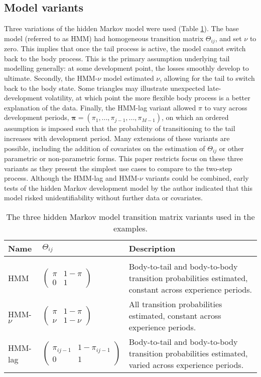 \subsection{Model variants}
Three variations of the hidden Markov model were used (Table \ref{table:variants}). 
The base model (referred to as HMM) had homogeneous transition matrix $\Theta_{ij}$,
and set $\nu$ to zero. This implies that once the tail
process is active, the model cannot switch back to the
body process. This is the primary assumption underlying
tail modelling generally: at some development point, the 
losses smoothly develop to ultimate. Secondly, the HMM-$\nu$
model estimated $\nu$, allowing for the tail to switch
back to the body state. Some triangles may illustrate
unexpected late-development volatility, at which point
the more flexible body process is a better explanation
of the data. Finally, the HMM-lag variant allowed $\pi$
to vary across development periods, $\bm{\pi} = (\pi_{1}, 
..., \pi_{j - 1}, ..., \pi_{M - 1})$, on which 
an ordered assumption is imposed such that the probability
of transitioning to the tail increases with development period.
Many extensions of these variants are possible, including
the addition of covariates on the estimation of
$\Theta_{ij}$ or other parametric or non-parametric
forms. This paper restricts focus on these three
variants as they present the simplest use cases
to compare to the two-step process. Although
the HMM-lag and HMM-$\nu$ variants could be combined,
early tests of the hidden Markov development model
by the author indicated that this model risked unidentifiability
without further data or covariates.

\begin{table}
    \centering
    \begin{tabular}{p{2cm}|p{3.5cm}|p{7cm}}
        Name & $\Theta_{ij}$ & Description \\
        \hline\\
        HMM & $\begin{pmatrix} \pi & 1 - \pi \\ 0 & 1 \end{pmatrix}$ & 
        Body-to-tail and body-to-body transition probabilities estimated, constant
        across experience periods.\\
        HMM-$\nu$ & $\begin{pmatrix} \pi & 1 - \pi \\ \nu & 1 - \nu \end{pmatrix}$ &
        All transition probabilities estimated, constant across experience periods.\\
        HMM-lag & $\begin{pmatrix} \pi_{ij-1} & 1 - \pi_{ij-1} \\ 0 & 1 \end{pmatrix}$ &
        Body-to-tail and body-to-body transition probabilities estimated,
        varied across experience periods.\\
    \end{tabular}
    \caption{
        The three hidden Markov model transition matrix variants
        used in the examples.
    }
    \label{table:variants}
\end{table}

